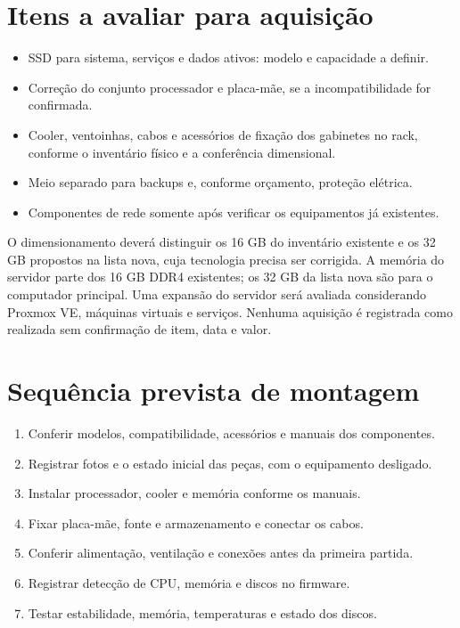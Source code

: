 \documentclass[11pt,a4paper,oneside]{report}
\begin{document}
\section{Itens a avaliar para aquisição}
\begin{itemize}
\item SSD para sistema, serviços e dados ativos: modelo e capacidade a definir.
\item Correção do conjunto processador e placa-mãe, se a incompatibilidade for confirmada.
\item Cooler, ventoinhas, cabos e acessórios de fixação dos gabinetes no rack,
conforme o inventário físico e a conferência dimensional.
\item Meio separado para backups e, conforme orçamento, proteção elétrica.
\item Componentes de rede somente após verificar os equipamentos já existentes.
\end{itemize}
O dimensionamento deverá distinguir os 16 GB do inventário existente e os
32 GB propostos na lista nova, cuja tecnologia precisa ser corrigida. A memória
do servidor parte dos 16 GB DDR4 existentes; os 32 GB da lista nova são para o
computador principal. Uma expansão do servidor será avaliada considerando
Proxmox VE, máquinas virtuais e serviços. Nenhuma aquisição é registrada
como realizada sem confirmação de item, data e valor.

\section{Sequência prevista de montagem}
\begin{enumerate}
\item Conferir modelos, compatibilidade, acessórios e manuais dos componentes.
\item Registrar fotos e o estado inicial das peças, com o equipamento desligado.
\item Instalar processador, cooler e memória conforme os manuais.
\item Fixar placa-mãe, fonte e armazenamento e conectar os cabos.
\item Conferir alimentação, ventilação e conexões antes da primeira partida.
\item Registrar detecção de CPU, memória e discos no firmware.
\item Testar estabilidade, memória, temperaturas e estado dos discos.
\end{enumerate}
\end{document}
